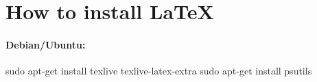 \chapter{How to install \LaTeX} 

\subsubsection*{Debian/Ubuntu:}
sudo apt-get install texlive texlive-latex-extra 
sudo apt-get install psutils
